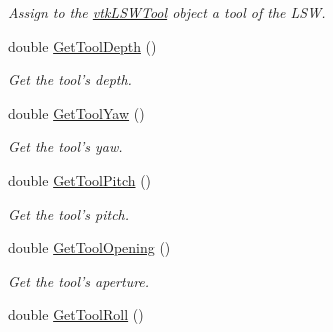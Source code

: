 \begin{DoxyCompactItemize}
\begin{DoxyCompactList}\small\item\em Assign to the \hyperlink{classvtkLSWTool}{vtkLSWTool} object a tool of the LSW. \item\end{DoxyCompactList}\item 
\hypertarget{classvtkLSWTool_a1210f50d89cc4e596cd3ac1a190bc6b0}{
double \hyperlink{classvtkLSWTool_a1210f50d89cc4e596cd3ac1a190bc6b0}{GetToolDepth} ()}
\label{classvtkLSWTool_a1210f50d89cc4e596cd3ac1a190bc6b0}

\begin{DoxyCompactList}\small\item\em Get the tool's depth. \item\end{DoxyCompactList}\item 
\hypertarget{classvtkLSWTool_a87fba85ba3b19ca11756b9f02ee11ec5}{
double \hyperlink{classvtkLSWTool_a87fba85ba3b19ca11756b9f02ee11ec5}{GetToolYaw} ()}
\label{classvtkLSWTool_a87fba85ba3b19ca11756b9f02ee11ec5}

\begin{DoxyCompactList}\small\item\em Get the tool's yaw. \item\end{DoxyCompactList}\item 
\hypertarget{classvtkLSWTool_ac1535996d9940b4682b00220b04f54ad}{
double \hyperlink{classvtkLSWTool_ac1535996d9940b4682b00220b04f54ad}{GetToolPitch} ()}
\label{classvtkLSWTool_ac1535996d9940b4682b00220b04f54ad}

\begin{DoxyCompactList}\small\item\em Get the tool's pitch. \item\end{DoxyCompactList}\item 
\hypertarget{classvtkLSWTool_a02a6dd9aca714fcab97f868f09640b9c}{
double \hyperlink{classvtkLSWTool_a02a6dd9aca714fcab97f868f09640b9c}{GetToolOpening} ()}
\label{classvtkLSWTool_a02a6dd9aca714fcab97f868f09640b9c}

\begin{DoxyCompactList}\small\item\em Get the tool's aperture. \item\end{DoxyCompactList}\item 
\hypertarget{classvtkLSWTool_a5b8c4b3783de3137bed9e391d99db5b6}{
double \hyperlink{classvtkLSWTool_a5b8c4b3783de3137bed9e391d99db5b6}{GetToolRoll} ()}
\label{classvtkLSWTool_a5b8c4b3783de3137bed9e391d99db5b6}


\end{DoxyCompactItemize}
